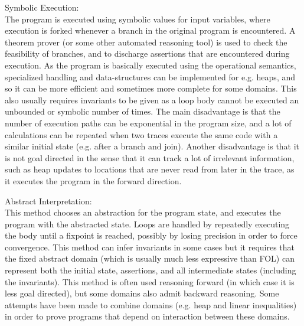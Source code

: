 Symbolic Execution:\\
The program is executed using symbolic values for input variables, where execution is forked whenever a branch in the original program is encountered.
A theorem prover (or some other automated reasoning tool) is used to check the feasibility of branches, and to discharge assertions that are encountered during execution.
As the program is basically executed using the operational semantics, specialized handling and data-structures can be implemented for e.g. heaps, and so it can be more efficient and sometimes more complete for some domains.
This also usually requires invariants to be given as a loop body cannot be executed an unbounded or symbolic number of times.
The main disadvantage is that the number of execution paths can be exponential in the program size, and a lot of calculations can be repeated when two traces execute the same code with a similar initial state (e.g. after a branch and join).
Another disadvantage is that it is not goal directed in the sense that it can track a lot of irrelevant information, such as heap updates to locations that are never read from later in the trace, as it executes the program in the forward direction.

Abstract Interpretation:\\
This method chooses an abstraction for the program state, and executes the program with the abstracted state.
Loops are handled by repeatedly executing the body until a fixpoint is reached, possibly by losing precision in order to force convergence.
This method can infer invariants in some cases but it requires that the fixed abstract domain (which is usually much less expressive than FOL) can represent both the initial state, assertions, and all intermediate states (including the invariants).
This method is often used reasoning forward (in which case it is less goal directed), but some domains also admit backward reasoning.
Some attempts have been made to combine domains (e.g. heap and linear inequalities) in order to prove programs that depend on interaction between these domains.

